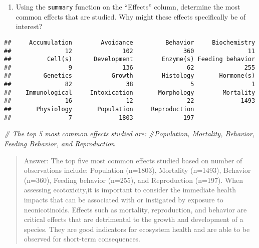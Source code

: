 \documentclass[
]{article}
\newenvironment{Shaded}{\begin{snugshade}}{\end{snugshade}}
\newcommand{\CommentTok}[1]{\textcolor[rgb]{0.56,0.35,0.01}{\textit{#1}}}
\newcommand{\FunctionTok}[1]{\textcolor[rgb]{0.00,0.00,0.00}{#1}}
\newcommand{\NormalTok}[1]{#1}
\newcommand{\SpecialCharTok}[1]{\textcolor[rgb]{0.00,0.00,0.00}{#1}}
\providecommand{\tightlist}{%
  \setlength{\itemsep}{0pt}\setlength{\parskip}{0pt}}
\begin{document}
\begin{enumerate}
\def\labelenumi{\arabic{enumi}.}
\setcounter{enumi}{5}
\tightlist
\item
  Using the \texttt{summary} function on the ``Effects'' column,
  determine the most common effects that are studied. Why might these
  effects specifically be of interest?
\end{enumerate}

\begin{Shaded}
\end{Shaded}

\begin{verbatim}
##     Accumulation        Avoidance         Behavior     Biochemistry 
##               12              102              360               11 
##          Cell(s)      Development        Enzyme(s) Feeding behavior 
##                9              136               62              255 
##         Genetics           Growth        Histology       Hormone(s) 
##               82               38                5                1 
##    Immunological     Intoxication       Morphology        Mortality 
##               16               12               22             1493 
##       Physiology       Population     Reproduction 
##                7             1803              197
\end{verbatim}

\begin{Shaded}
\begin{Highlighting}[]
\CommentTok{\# The top 5 most common effects studied are:}
\CommentTok{\#Population, Mortality, Behavior, Feeding Behavior, and Reproduction}
\end{Highlighting}
\end{Shaded}

\begin{quote}
Answer: The top five most common effects studied based on number of
observations include: Population (n=1803), Mortality (n=1493), Behavior
(n=360), Feeding behavior (n=255), and Reproduction (n=197). When
assessing ecotoxicity,it is important to consider the immediate health
impacts that can be associated with or instigated by exposure to
neonicotinoids. Effects such as mortality, reproduction, and behavior
are critical effects that are detrimental to the growth and development
of a species. They are good indicators for ecosystem health and are able
to be observed for short-term consequences.
\end{quote}
\end{document}
